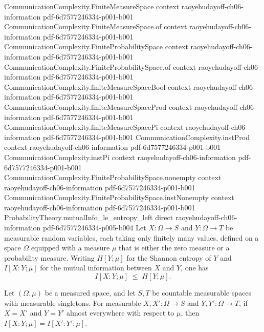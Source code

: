 \begin{theorem}
\label{ProbabilityTheory.mutualInfo_le_entropy_right}
\leanok
{}
\proofstep
  {CommunicationComplexity.FiniteMeasureSpace}
  {context}
  {raoyehudayoff-ch06-information}
  {pdf-6d7577246334-p001-b001}
\proofstep
  {CommunicationComplexity.FiniteMeasureSpace.of}
  {context}
  {raoyehudayoff-ch06-information}
  {pdf-6d7577246334-p001-b001}
\proofstep
  {CommunicationComplexity.FiniteProbabilitySpace}
  {context}
  {raoyehudayoff-ch06-information}
  {pdf-6d7577246334-p001-b001}
\proofstep
  {CommunicationComplexity.FiniteProbabilitySpace.of}
  {context}
  {raoyehudayoff-ch06-information}
  {pdf-6d7577246334-p001-b001}
\proofstep
  {CommunicationComplexity.finiteMeasureSpaceBool}
  {context}
  {raoyehudayoff-ch06-information}
  {pdf-6d7577246334-p001-b001}
\proofstep
  {CommunicationComplexity.finiteMeasureSpaceProd}
  {context}
  {raoyehudayoff-ch06-information}
  {pdf-6d7577246334-p001-b001}
\proofstep
  {CommunicationComplexity.finiteMeasureSpacePi}
  {context}
  {raoyehudayoff-ch06-information}
  {pdf-6d7577246334-p001-b001}
\proofstep
  {CommunicationComplexity.instProd}
  {context}
  {raoyehudayoff-ch06-information}
  {pdf-6d7577246334-p001-b001}
\proofstep
  {CommunicationComplexity.instPi}
  {context}
  {raoyehudayoff-ch06-information}
  {pdf-6d7577246334-p001-b001}
\proofstep
  {CommunicationComplexity.FiniteProbabilitySpace.nonempty}
  {context}
  {raoyehudayoff-ch06-information}
  {pdf-6d7577246334-p001-b001}
\proofstep
  {CommunicationComplexity.FiniteProbabilitySpace.instNonempty}
  {context}
  {raoyehudayoff-ch06-information}
  {pdf-6d7577246334-p001-b001}
\proofstep
  {ProbabilityTheory.mutualInfo_le_entropy_left}
  {direct}
  {raoyehudayoff-ch06-information}
  {pdf-6d7577246334-p005-b004}
Let $X \colon \Omega \to S$ and $Y \colon \Omega \to T$ be measurable random variables,
each taking only finitely many values, defined on a space $\Omega$ equipped with a
measure $\mu$ that is either the zero measure or a probability measure. Writing
$H[Y;\mu]$ for the Shannon entropy of $Y$ and $I[X:Y;\mu]$ for the mutual information
between $X$ and $Y$, one has
\[
  I[X:Y;\mu] \;\le\; H[Y;\mu].
\]
\end{theorem}

\begin{theorem}
\label{ProbabilityTheory.mutualInfo_congr_ae}
\leanok
{}
Let $(\Omega,\mu)$ be a measured space, and let $S,T$ be countable measurable spaces
with measurable singletons. For measurable $X,X':\Omega\to S$ and $Y,Y':\Omega\to T$, if
$X=X'$ and $Y=Y'$ almost everywhere with respect to $\mu$, then
$I[X:Y;\mu]=I[X':Y';\mu]$.
\end{theorem}

